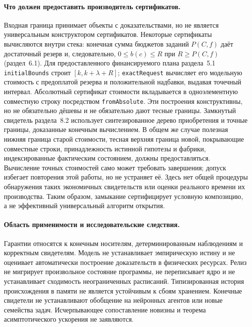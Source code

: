 \documentclass[10pt,a4paper]{article}
\newcommand{\rc}[1]{\allowbreak\texttt{#1}\allowbreak}
\begin{document}
\paragraph{Что должен предоставить производитель сертификатов.}
Входная граница принимает объекты с доказательствами, но не является универсальным конструктором сертификатов. Некоторые сертификаты вычисляются внутри стека: конечная сумма бюджетов заданий $P(C,f)$ даёт достаточный резерв и, следовательно, $0\le b(c)\le R$ при $R\ge P(C,f)$ (раздел~6.1). Для предоставленного финансируемого плана раздела~5.1 \rc{initialBounds} строит $[k,k+\lambda+R]$; \rc{exactRequest} вычисляет его модельную стоимость с предоплатой резерва и положительной надбавки, выдавая точечный интервал. Абсолютный сертификат стоимости вкладывается в одноэлементную совместную строку посредством \rc{fromAbsolute}. Эти построения конструктивны, но не обязательно дёшевы и не обязательно дают тесные границы. Замкнутый свидетель раздела~8.2 использует синтезированное дерево приобретения и точные границы, доказанные конечным вычислением. В общем же случае полезная нижняя граница старой стоимости, тесная верхняя граница новой, покрывающие совместные строки, принадлежность истинной гипотезы и фабрики, индексированные фактическим состоянием, должны предоставляться. Вычисление точных стоимостей само может требовать завершения; допуск избегает повторения этой работы, но не устраняет её. Здесь нет общей процедуры обнаружения таких экономичных свидетельств или оценки реального времени их производства. Таким образом, замыкание сертифицирует условную композицию, а не эффективный универсальный алгоритм открытия.

\paragraph{Область применимости и исследовательские следствия.}
Гарантии относятся к конечным носителям, детерминированным наблюдениям и корректным свидетелям. Модель не устанавливает эмпирическую истину и не оценивает автоматически построение доказательств в физических ресурсах. Релиз не мигрирует произвольное состояние программы, не переписывает ядро и не устанавливает сходимость неограниченных расписаний. Типизированная история происхождения в памяти не является устойчивым к сбоям хранением. Конечные свидетели не устанавливают обобщение на нейронных агентов или новые семейства задач. Исчерпывающее сопоставление новизны и теорема асимптотического ускорения не заявляются.
\end{document}
